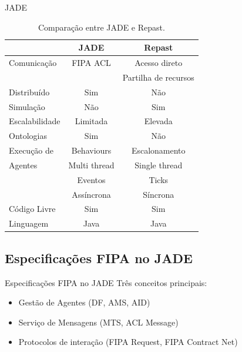 \begin{frame}{JADE}
	\begin{table}[h]
		\label{tab:jadevsrep}
		\tiny
		\begin{center}
			\begin{tabular}{l|cc}
			\hline

			\hline
			\textbf{} & \textbf{JADE} & \textbf{Repast} \\ %
			\hline
				Comunicação & FIPA ACL &  Acesso direto  \\ %
							  &			 &  Partilha de recursos \\
			\hline
				Distribuído & Sim & Não \\ 
			\hline
				Simulação & Não & Sim \\ 
			\hline
				Escalabilidade & Limitada & Elevada \\ 
			\hline
				Ontologias & Sim & Não \\
			\hline
				Execução de & Behaviours 	& Escalonamento  	\\ %
				Agentes		& Multi thread 	& Single thread 	\\ %
							& Eventos   	& Ticks		 	   	\\ %
							& Assíncrona 	& Síncrona 		   	\\ %
			\hline
				Código Livre & Sim & Sim \\ 
			\hline
				Linguagem & Java & Java \\ 
			\hline
			\end{tabular}
		\end{center}
		\caption{Comparação entre JADE e Repast.}
	\end{table}
\end{frame}

\subsection{Especificações FIPA no JADE}
\begin{frame}{Especificações FIPA no JADE}
	Três conceitos principais:
		\begin{itemize}
			\item Gestão de Agentes (DF, AMS, AID)
			\item Serviço de Mensagens (MTS, ACL Message)
			\item Protocolos de interação (FIPA Request, FIPA Contract Net)
		\end{itemize}
		
\end{frame}


